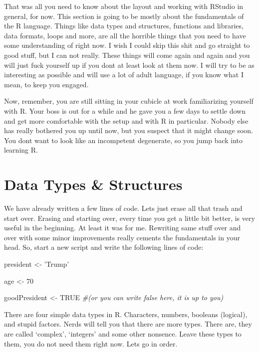 \documentclass[]{book}
\newenvironment{Shaded}{\begin{snugshade}}{\end{snugshade}}
\newcommand{\CommentTok}[1]{\textcolor[rgb]{0.56,0.35,0.01}{\textit{#1}}}
\newcommand{\DecValTok}[1]{\textcolor[rgb]{0.00,0.00,0.81}{#1}}
\newcommand{\NormalTok}[1]{#1}
\newcommand{\OtherTok}[1]{\textcolor[rgb]{0.56,0.35,0.01}{#1}}
\newcommand{\StringTok}[1]{\textcolor[rgb]{0.31,0.60,0.02}{#1}}
\begin{document}
That was all you need to know about the layout and working with RStudio in general, for now. This section is going to be mostly about the fundamentals of the R language. Things like data types and structures, functions and libraries, data formats, loops and more, are all the horrible things that you need to have some understanding of right now. I wish I could skip this shit and go straight to good stuff, but I can not really. These things will come again and again and you will just fuck yourself up if you dont at least look at them now. I will try to be as interesting as possible and will use a lot of adult language, if you know what I mean, to keep you engaged.

Now, remember, you are still sitting in your cubicle at work familiarizing yourself with R. Your boss is out for a while and he gave you a few days to settle down and get more comfortable with the setup and with R in particular. Nobody else has really bothered you up until now, but you suspect that it might change soon. You dont want to look like an incompetent degenerate, so you jump back into learning R.

\hypertarget{data-types-structures}{%
\section{Data Types \& Structures}\label{data-types-structures}}

We have already written a few lines of code. Lets just erase all that trash and start over. Erasing and starting over, every time you get a little bit better, is very useful in the beginning. At least it was for me. Rewriting same stuff over and over with some minor improvements really cements the fundamentals in your head. So, start a new script and write the following lines of code:

\begin{Shaded}
\begin{Highlighting}[]
\NormalTok{president <-}\StringTok{ 'Trump'}

\NormalTok{age <-}\StringTok{ }\DecValTok{70}

\NormalTok{goodPresident <-}\StringTok{ }\OtherTok{TRUE} 
\CommentTok{#(or you can write false here, it is up to you)}
\end{Highlighting}
\end{Shaded}

There are four simple data types in R. Characters, numbers, booleans (logical), and stupid factors. Nerds will tell you that there are more types. There are, they are called `complex', `integers' and some other nonsence. Leave these types to them, you do not need them right now. Lets go in order.
\end{document}
